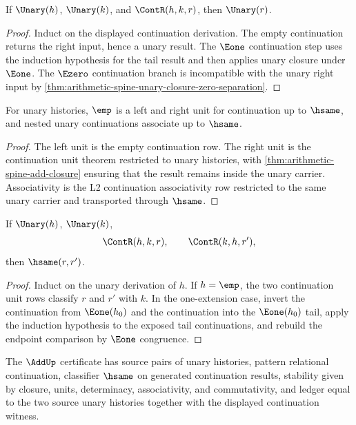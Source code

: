 \begin{theorem}
\label{thm:arithmetic-spine-add-closure}
If $\Unary(h)$, $\Unary(k)$, and $\ContR(h,k,r)$, then $\Unary(r)$.
\end{theorem}

\begin{proof}
Induct on the displayed continuation derivation.  The empty continuation
returns the right input, hence a unary result.  The $\Eone$ continuation step
uses the induction hypothesis for the tail result and then applies unary
closure under $\Eone$.  The $\Ezero$ continuation branch is incompatible with
the unary right input by \autoref{thm:arithmetic-spine-unary-closure-zero-separation}.
\end{proof}

\begin{theorem}
\label{thm:arithmetic-spine-add-unit-assoc}
For unary histories, $\emp$ is a left and right unit for continuation up to
$\hsame$, and nested unary continuations associate up to $\hsame$.
\end{theorem}

\begin{proof}
The left unit is the empty continuation row.  The right unit is the
continuation unit theorem restricted to unary histories, with
\autoref{thm:arithmetic-spine-add-closure} ensuring that the result remains
inside the unary carrier.  Associativity is the L2 continuation associativity
row restricted to the same unary carrier and transported through $\hsame$.
\end{proof}

\begin{theorem}
\label{thm:arithmetic-spine-add-commutativity}
If $\Unary(h)$, $\Unary(k)$,
$$
\ContR(h,k,r),
\qquad
\ContR(k,h,r'),
$$
then $\hsame(r,r')$.
\end{theorem}

\begin{proof}
Induct on the unary derivation of $h$.  If $h=\emp$, the two continuation
unit rows classify $r$ and $r'$ with $k$.  In the one-extension case, invert
the continuation from $\Eone(h_0)$ and the continuation into the
$\Eone(h_0)$ tail, apply the induction hypothesis to the exposed tail
continuations, and rebuild the endpoint comparison by $\Eone$ congruence.
\end{proof}

\begin{definition}
\label{def:arithmetic-spine-add-namecert}
The $\AddUp$ certificate has source pairs of unary histories, pattern
relational continuation, classifier $\hsame$ on generated continuation
results, stability given by closure, units, determinacy, associativity, and
commutativity, and ledger equal to the two source unary histories together
with the displayed continuation witness.
\end{definition}

